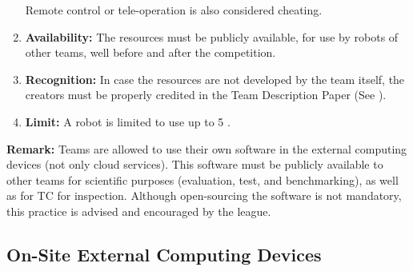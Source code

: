 \begin{enumerate}
	  Remote control or tele-operation is also considered cheating. 
	\item \textbf{Availability:} The resources must be publicly available, for use by robots of other teams, well before and after the competition.
	\item \textbf{Recognition:} In case the resources are not developed by the team itself, the creators must be properly credited in the Team Description Paper (See ).
	\item \textbf{Limit:} A robot is limited to use up to 5 . 
\end{enumerate}

\textbf{Remark:} Teams are allowed to use their own software in the external computing devices (not only cloud services). This software must be publicly available to other teams for scientific purposes (evaluation, test, and benchmarking), as well as for TC for inspection. Although open-sourcing the software is not mandatory, this practice is advised and encouraged by the league.

\subsection{On-Site External Computing Devices}
\label{rule:robot_external_computing_devices}

